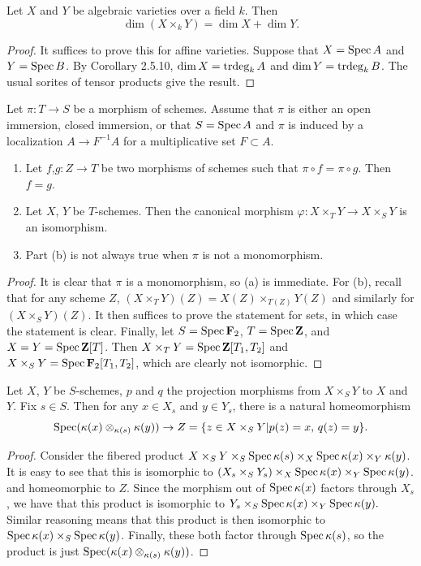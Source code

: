 \begin{exer}
	Let $X$ and $Y$ be algebraic varieties over a field $k$. Then
	\[
		\dim (X \times_k Y) = \dim X + \dim Y.
	\]
\end{exer}
\begin{proof}
	It suffices to prove this for affine varieties. Suppose that $X = \operatorname{Spec}
	A$ and $Y = \operatorname{Spec} B$. By Corollary 2.5.10, $\dim X = \operatorname{trdeg}_k A$ and
	$\dim Y = \operatorname{trdeg}_k B$. The usual sorites of tensor products give the
	result.
\end{proof}

\begin{exer}
	Let $\pi: T \to S$ be a morphism of schemes. Assume that $\pi$ is either
	an open immersion, closed immersion, or that $S = \operatorname{Spec} A$ and $\pi$ is
	induced by a localization $A \to F^{-1}A$ for a multiplicative set $F
	\subset A$.
	\begin{enumerate}[label=(\alph*)]
		\item Let $f$,$g: Z \to T$ be two morphisms of schemes such that
			$\pi \circ f = \pi \circ g$. Then $f = g$.
		\item Let $X$, $Y$ be $T$-schemes. Then the canonical morphism
			$\varphi: X \times_T Y \to X \times_S Y$ is an
			isomorphism.
		\item Part (b) is not always true when $\pi$ is not a
			monomorphism.
	\end{enumerate}
\end{exer}
\begin{proof}
	It is clear that $\pi$ is a monomorphism, so (a) is immediate. For
	(b), recall that for any scheme $Z$, $(X \times_T Y)(Z) =
	X(Z) \times_{T(Z)} Y(Z)$ and similarly for $(X \times_S Y)(Z)$. It then
	suffices to prove the statement for sets, in which case the statement
	is clear. Finally, let $S = \operatorname{Spec} \mathbf{F}_2$, $T = \operatorname{Spec} \mathbf{Z}$, and $X = Y =
	\operatorname{Spec} \mathbf{Z}[T]$. Then $X \times_T Y = \operatorname{Spec} \mathbf{Z}[T_1,T_2]$ and $X \times_S
	Y = \operatorname{Spec} \mathbf{F}_2[T_1,T_2]$, which are clearly not isomorphic.
\end{proof}

\begin{exer}
	Let $X$, $Y$ be $S$-schemes, $p$ and $q$ the projection morphisms from
	$X \times_S Y$ to $X$ and $Y$. Fix $s \in S$. Then for any $x \in X_s$
	and $y \in Y_s$, there is a natural homeomorphism
	\[
		\operatorname{Spec}(\kappa(x) \otimes_{\kappa(s)} \kappa(y))
		\to Z = \{z \in X \times_S Y | p(z) = x,\, q(z) = y\}.
	\]
\end{exer}
\begin{proof}
	Consider the fibered product
	$X \times_S Y \times_S \operatorname{Spec} \kappa(s) \times_X \operatorname{Spec} \kappa(x)
	\times_Y \kappa(y)$. It is easy to see that this is isomorphic to
	$(X_s \times_S Y_s) \times_X \operatorname{Spec} \kappa(x) \times_Y \operatorname{Spec} \kappa(y)$.
	and homeomorphic to $Z$. Since the morphism out of $\operatorname{Spec} \kappa(x)$
	factors through $X_s$, we have that this product is isomorphic to $Y_s
	\times_S \operatorname{Spec} \kappa(x) \times_Y \operatorname{Spec} \kappa(y).$ Similar reasoning
	means that this product is then isomorphic to $\operatorname{Spec} \kappa(x) \times_S
	\operatorname{Spec} \kappa(y)$. Finally, these both factor through $\operatorname{Spec} \kappa(s)$,
	so the product is just $\operatorname{Spec}(\kappa(x) \otimes_{\kappa(s)} \kappa(y))$.
\end{proof}
